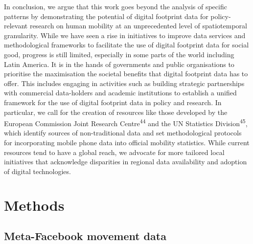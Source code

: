 \documentclass[
  11pt,
]{article}
\begin{document}
In conclusion, we argue that this work goes beyond the analysis of
specific patterns by demonstrating the potential of digital footprint
data for policy-relevant research on human mobility at an unprecedented
level of spatiotemporal granularity. While we have seen a rise in
initiatives to improve data services and methodological frameworks to
facilitate the use of digital footprint data for social good, progress
is still limited, especially in some parts of the world including Latin
America. It is in the hands of governments and public organisations to
prioritise the maximisation the societal benefits that digital footprint
data has to offer. This includes engaging in activities such as building
strategic partnerships with commercial data-holders and academic
institutions to establish a unified framework for the use of digital
footprint data in policy and research. In particular, we call for the
creation of resources like those developed by the European Commission
Joint Research Centre\textsuperscript{44} and the UN Statistics
Division\textsuperscript{45}, which identify sources of non-traditional
data and set methodological protocols for incorporating mobile phone
data into official mobility statistics. While current resources tend to
have a global reach, we advocate for more tailored local initiatives
that acknowledge disparities in regional data availability and adoption
of digital technologies.

\section{Methods}\label{sec-methods}

\subsection{Meta-Facebook movement
data}\label{meta-facebook-movement-data}
\end{document}

